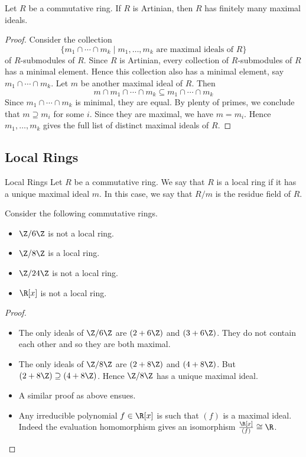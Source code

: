 \documentclass[a4paper]{article}
\begin{document}
\begin{prp}{}{} Let $R$ be a commutative ring. If $R$ is Artinian, then $R$ has finitely many maximal ideals. \tcbline
\begin{proof}
Consider the collection $$\{m_1\cap\cdots\cap m_k\;|\;m_1,\dots,m_k\text{ are maximal ideals of }R\}$$ of $R$-submodules of $R$. Since $R$ is Artinian, every collection of $R$-submodules of $R$ has a minimal element. Hence this collection also has a minimal element, say $m_1\cap\cdots\cap m_k$. Let $m$ be another maximal ideal of $R$. Then $$m\cap m_1\cap\cdots\cap m_k\subseteq m_1\cap\cdots\cap m_k$$ Since $m_1\cap\cdots\cap m_k$ is minimal, they are equal. By plenty of primes, we conclude that $m\supseteq m_i$ for some $i$. Since they are maximal, we have $m=m_i$. Hence $m_1,\dots,m_k$ gives the full list of distinct maximal ideals of $R$. 
\end{proof}
\end{prp}

\subsection{Local Rings}
\begin{defn}{Local Rings}{} Let $R$ be a commutative ring. We say that $R$ is a local ring if it has a unique maximal ideal $m$. In this case, we say that $R/m$ is the residue field of $R$. 
\end{defn}

\begin{eg}{}{} Consider the following commutative rings. 
\begin{itemize}
\item $\Z/6\Z$ is not a local ring. 
\item $\Z/8\Z$ is a local ring. 
\item $\Z/24\Z$ is not a local ring. 
\item $\R[x]$ is not a local ring. 
\end{itemize} \tcbline
\begin{proof}~\\
\begin{itemize}
\item The only ideals of $\Z/6\Z$ are $(2+6\Z)$ and $(3+6\Z)$. They do not contain each other and so they are both maximal. 
\item The only ideals of $\Z/8\Z$ are $(2+8\Z)$ and $(4+8\Z)$. But $(2+8\Z)\supseteq(4+8\Z)$. Hence $\Z/8\Z$ has a unique maximal ideal. 
\item A similar proof as above ensues. 
\item Any irreducible polynomial $f\in\R[x]$ is such that $(f)$ is a maximal ideal. Indeed the evaluation homomorphism gives an isomorphism $\frac{\R[x]}{(f)}\cong\R$. 
\end{itemize}
\end{proof}
\end{eg}
\end{document}
